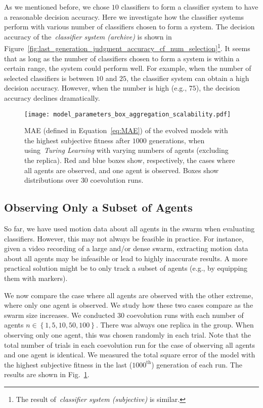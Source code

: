As we mentioned before, we chose $10$ classifiers to form a classifier system to have a reasonable decision accuracy. Here we investigate how the classifier systems perform with various number of classifiers chosen to form a system. The decision accuracy of the~\textit{classifier system (archive)} is shown in Figure~\ref{fig:last_generation_judgment_accuracy_cf_num_selection}\footnote{The result of~\textit{classifier system (subjective)} is similar.}. It seems that as long as the number of classifiers chosen to form a system is within a certain range, the system could perform well. For example, when the number of selected classifiers is between $10$ and $25$, the classifier system can obtain a high decision accuracy. However, when the number is high (e.g., $75$), the decision accuracy declines dramatically.
%
\begin{figure}[!t]%
	\centering
	\texttt{[image: model\_parameters\_box\_aggregation\_scalability.pdf]}
	\caption{MAE (defined in Equation~\eqref{eq:MAE}) of the evolved models with the highest subjective fitness after $1000$ generations, when using~\textit{Turing Learning} with varying numbers of agents (excluding the replica). Red and blue boxes show, respectively, the cases where all agents are observed, and one agent is observed. Boxes show distributions over $30$ coevolution runs. }
	\label{fig:model_parameters_box_aggregation_scalability}
\end{figure}
%
\subsection{Observing Only a Subset of Agents}\label{sec:observing_a_subset_agents_swarm_simulation}
So far, we have used motion data about all agents in the swarm when evaluating classifiers. However, this may not always be feasible in practice. For instance, given a video recording of a large and/or dense swarm, extracting motion data about all agents may be infeasible or lead to highly inaccurate results. A more practical solution might be to only track a subset of agents (e.g., by equipping them with markers).

We now compare the case where all agents are observed with the other extreme, where only one agent is observed. We study how these two cases compare as the swarm size increases. We conducted $30$ coevolution runs with each number of agents $n\in\left\{1, 5, 10, 50, 100\right\}$. There was always one replica in the group. When observing only one agent, this was chosen randomly in each trial. Note that the total number of trials in each coevolution run for the case of observing all agents and one agent is identical. We measured the total square error of the model with the highest subjective fitness in the last ($1000^\textrm{th}$) generation of each run. The results are shown in Fig.~\ref{fig:model_parameters_box_aggregation_scalability}.

